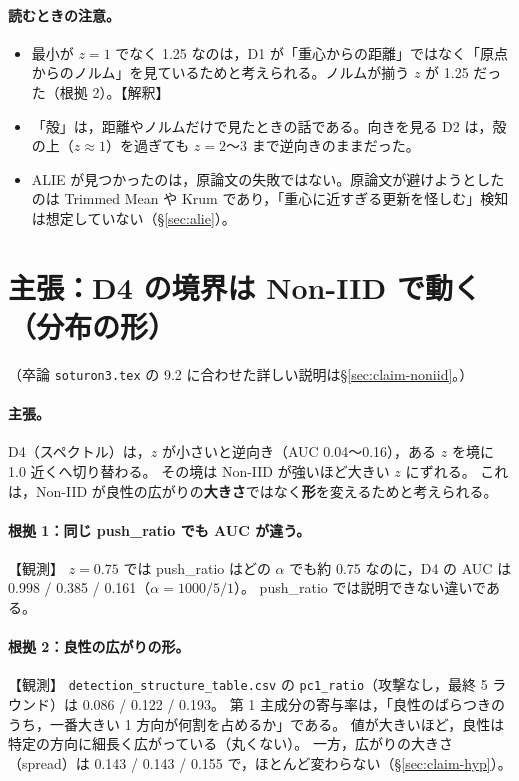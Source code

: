 \documentclass[a4j, dvipdfmx]{jsarticle}  %
\begin{document}
\paragraph{読むときの注意。}
\begin{itemize}
  \item 最小が $z = 1$ でなく 1.25 なのは，D1 が「重心からの距離」ではなく「原点からのノルム」を見ているためと考えられる。ノルムが揃う $z$ が 1.25 だった（根拠 2）。【解釈】
  \item 「殻」は，距離やノルムだけで見たときの話である。向きを見る D2 は，殻の上（$z \approx 1$）を過ぎても $z = 2$〜3 まで逆向きのままだった。
  \item ALIE が見つかったのは，原論文の失敗ではない。原論文が避けようとしたのは Trimmed Mean や Krum であり，「重心に近すぎる更新を怪しむ」検知は想定していない（\S\ref{sec:alie}）。
\end{itemize}

\section{主張：D4 の境界は Non-IID で動く（分布の形）}
\label{sec:claim-d4}

（卒論 \texttt{soturon3.tex} の 9.2 に合わせた詳しい説明は\S\ref{sec:claim-noniid}。）

\paragraph{主張。}
D4（スペクトル）は，$z$ が小さいと逆向き（AUC 0.04〜0.16），ある $z$ を境に 1.0 近くへ切り替わる。
その境は Non-IID が強いほど大きい $z$ にずれる。
これは，Non-IID が良性の広がりの\textbf{大きさ}ではなく\textbf{形}を変えるためと考えられる。

\paragraph{根拠 1：同じ push\_ratio でも AUC が違う。}【観測】
$z = 0.75$ では push\_ratio はどの $\alpha$ でも約 0.75 なのに，D4 の AUC は 0.998 / 0.385 / 0.161（$\alpha = 1000 / 5 / 1$）。
push\_ratio では説明できない違いである。

\paragraph{根拠 2：良性の広がりの形。}【観測】
\texttt{detection\_structure\_table.csv} の \texttt{pc1\_ratio}（攻撃なし，最終 5 ラウンド）は 0.086 / 0.122 / 0.193。
第 1 主成分の寄与率は，「良性のばらつきのうち，一番大きい 1 方向が何割を占めるか」である。
値が大きいほど，良性は特定の方向に細長く広がっている（丸くない）。
一方，広がりの大きさ（spread）は 0.143 / 0.143 / 0.155 で，ほとんど変わらない（\S\ref{sec:claim-hyp}）。
\end{document}

